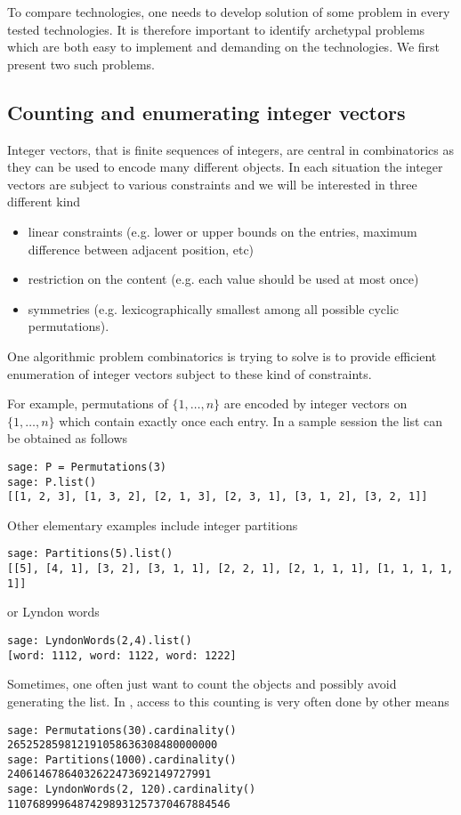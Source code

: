 \documentclass{deliverablereport}
\begin{document}
To compare technologies, one needs to develop solution of some problem in
every tested technologies. It is therefore important to identify archetypal
problems which are both easy to implement and demanding on the technologies.
We first present two such problems.

\subsection{Counting and enumerating integer vectors}
Integer vectors, that is finite sequences of integers, are central
in combinatorics as they can be used to encode many different
objects. In each situation the integer vectors are subject to various
constraints and we will be interested in three different kind
\begin{itemize}
\item linear constraints (e.g. lower or upper bounds on the entries,
maximum difference between adjacent position, etc)
\item restriction on the content (e.g. each value should be used
at most once)
\item symmetries (e.g. lexicographically smallest among all possible
cyclic permutations).
\end{itemize}
One algorithmic problem combinatorics is trying to solve is to provide
efficient enumeration of integer vectors subject to these kind of
constraints.

For example, permutations of $\{1, \ldots, n\}$ are encoded by integer vectors
on $\{1, \ldots, n\}$ which contain exactly once each entry. In a sample
\Sage session the list can be obtained as follows
\begin{verbatim}
sage: P = Permutations(3)
sage: P.list()
[[1, 2, 3], [1, 3, 2], [2, 1, 3], [2, 3, 1], [3, 1, 2], [3, 2, 1]]
\end{verbatim}
Other elementary examples include integer partitions
\begin{verbatim}
sage: Partitions(5).list()
[[5], [4, 1], [3, 2], [3, 1, 1], [2, 2, 1], [2, 1, 1, 1], [1, 1, 1, 1, 1]]
\end{verbatim}
or Lyndon words
\begin{verbatim}
sage: LyndonWords(2,4).list()
[word: 1112, word: 1122, word: 1222]
\end{verbatim}

Sometimes, one often just want to count the objects and possibly avoid
generating the list. In \Sage, access to this counting is very often
done by other means
\begin{verbatim}
sage: Permutations(30).cardinality()
265252859812191058636308480000000
sage: Partitions(1000).cardinality()
24061467864032622473692149727991
sage: LyndonWords(2, 120).cardinality()
11076899964874298931257370467884546
\end{verbatim}
\end{document}
